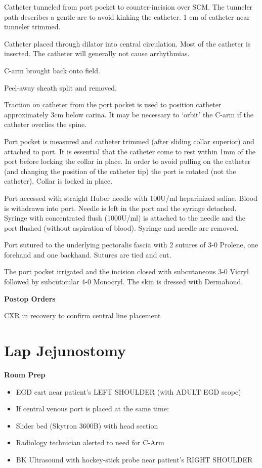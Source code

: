 \documentclass[
]{book}
\providecommand{\tightlist}{%
  \setlength{\itemsep}{0pt}\setlength{\parskip}{0pt}}
\begin{document}
Catheter tunneled from port pocket to counter-incision over SCM. The tunneler path describes a gentle arc to avoid kinking the catheter. 1 cm of catheter near tunneler trimmed.

Catheter placed through dilator into central circulation. Most of the catheter is inserted. The catheter will generally not cause arrhythmias.

C-arm brought back onto field.

Peel-away sheath split and removed.

Traction on catheter from the port pocket is used to position catheter approximately 3cm below carina. It may be necessary to `orbit' the C-arm if the catheter overlies the spine.

Port pocket is measured and catheter trimmed (after sliding collar superior) and attached to port. It is essential that the catheter come to rest within 1mm of the port before locking the collar in place. In order to avoid pulling on the catheter (and changing the position of the catheter tip) the port is rotated (not the catheter). Collar is locked in place.

Port accessed with straight Huber needle with 100U/ml heparinized saline. Blood is withdrawn into port. Needle is left in the port and the syringe detached. Syringe with concentrated flush (1000U/ml) is attached to the needle and the port flushed (without aspiration of blood). Syringe and needle are removed.

Port sutured to the underlying pectoralis fascia with 2 sutures of 3-0 Prolene, one forehand and one backhand. Sutures are tied and cut.

The port pocket irrigated and the incision closed with subcutaneous 3-0 Vicryl followed by subcuticular 4-0 Monocryl. The skin is dressed with Dermabond.

\textbf{Postop Orders}

CXR in recovery to confirm central line placement

\hypertarget{lap-jejunostomy}{%
\chapter{Lap Jejunostomy}\label{lap-jejunostomy}}

\textbf{Room Prep}

\begin{itemize}
\tightlist
\item
  EGD cart near patient's LEFT SHOULDER (with ADULT EGD scope)
\item
  If central venous port is placed at the same time:
\item
  Slider bed (Skytron 3600B) with head section
\item
  Radiology technician alerted to need for C-Arm
\item
  BK Ultrasound with hockey-stick probe near patient's RIGHT SHOULDER
\end{itemize}
\end{document}
